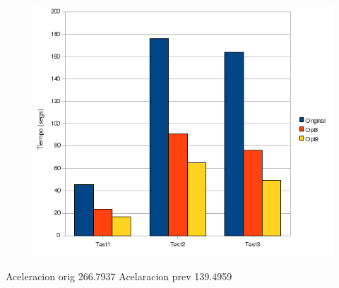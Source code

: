 \begin{figure}[ht]
   \centering
   \includegraphics[keepaspectratio=true,width=.6\textwidth]{figures/opt9-perf}
\end{figure}

Aceleracion orig	266.7937%
Acelaracion prev	139.4959%

